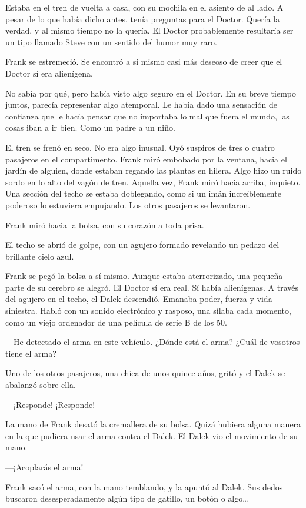 Estaba en el tren de vuelta a casa, con su mochila en el asiento de al
lado. A pesar de lo que había dicho antes, tenía preguntas para el
Doctor. Quería la verdad, y al mismo tiempo no la quería. El Doctor
probablemente resultaría ser un tipo llamado Steve con un sentido del
humor muy raro.

Frank se estremeció. Se encontró a sí mismo casi más deseoso de creer
que el Doctor sí era alienígena.

No sabía por qué, pero había visto algo seguro en el Doctor. En su breve
tiempo juntos, parecía representar algo atemporal. Le había dado una
sensación de confianza que le hacía pensar que no importaba lo mal que
fuera el mundo, las cosas iban a ir bien. Como un padre a un niño.

El tren se frenó en seco. No era algo inusual. Oyó suspiros de tres o
cuatro pasajeros en el compartimento. Frank miró embobado por la
ventana, hacia el jardín de alguien, donde estaban regando las plantas
en hilera. Algo hizo un ruido sordo en lo alto del vagón de tren.
Aquella vez, Frank miró hacia arriba, inquieto. Una sección del techo se
estaba doblegando, como si un imán increíblemente poderoso lo estuviera
empujando. Los otros pasajeros se levantaron.

Frank miró hacia la bolsa, con su corazón a toda prisa.

El techo se abrió de golpe, con un agujero formado revelando un pedazo
del brillante cielo azul.

Frank se pegó la bolsa a sí mismo. Aunque estaba aterrorizado, una
pequeña parte de su cerebro se alegró. El Doctor sí era real. Sí había
alienígenas. A través del agujero en el techo, el Dalek descendió.
Emanaba poder, fuerza y vida siniestra. Habló con un sonido electrónico
y rasposo, una sílaba cada momento, como un viejo ordenador de una
película de serie B de los 50.

---He detectado el arma en este vehículo. ¿Dónde está el arma? ¿Cuál de
vosotros tiene el arma?

Uno de los otros pasajeros, una chica de unos quince años, gritó y el
Dalek se abalanzó sobre ella.

---¡Responde! ¡Responde!

La mano de Frank desató la cremallera de su bolsa. Quizá hubiera alguna
manera en la que pudiera usar el arma contra el Dalek. El Dalek vio el
movimiento de su mano.

---¡Acoplarás el arma!

Frank sacó el arma, con la mano temblando, y la apuntó al Dalek. Sus
dedos buscaron desesperadamente algún tipo de gatillo, un botón o
algo\ldots{}

